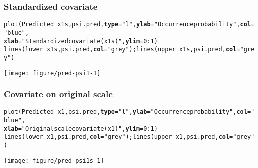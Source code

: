 \documentclass[color=usenames,dvipsnames]{beamer}\usepackage[]{graphicx}\usepackage[]{xcolor}
\makeatletter
\newcommand{\hlnum}[1]{\textcolor[rgb]{0.69,0.494,0}{#1}}%
\newcommand{\hlsng}[1]{\textcolor[rgb]{0.749,0.012,0.012}{#1}}%
\newcommand{\hlopt}[1]{\textcolor[rgb]{0,0,0}{#1}}%
\newcommand{\hldef}[1]{\textcolor[rgb]{0,0,0}{#1}}%
\newcommand{\hlkwc}[1]{\textcolor[rgb]{0,0,0}{\textbf{#1}}}%
\newcommand{\hlkwd}[1]{\textcolor[rgb]{0.004,0.004,0.506}{#1}}%
\newenvironment{kframe}{%
 \def\at@end@of@kframe{}%
 \ifinner\ifhmode%
  \def\at@end@of@kframe{\end{minipage}}%
  \begin{minipage}{\columnwidth}%
 \fi\fi%
 \def\FrameCommand##1{\hskip\@totalleftmargin \hskip-\fboxsep
 \colorbox{shadecolor}{##1}\hskip-\fboxsep
     \hskip-\linewidth \hskip-\@totalleftmargin \hskip\columnwidth}%
 \MakeFramed {\advance\hsize-\width
   \@totalleftmargin\z@ \linewidth\hsize
   \@setminipage}}%
 {\par\unskip\endMakeFramed%
 \at@end@of@kframe}
\newenvironment{knitrout}{}{} %
\makeatother
\begin{document}
\begin{frame}[fragile]
  \frametitle{Standardized covariate}
\begin{knitrout}\tiny
{}\color{fgcolor}\begin{kframe}
\begin{alltt}
\hlkwd{plot}\hldef{(Predicted} \hlopt{~} \hldef{x1s, psi.pred,} \hlkwc{type}\hldef{=}\hlsng{"l"}\hldef{,} \hlkwc{ylab}\hldef{=}\hlsng{"Occurrence probability"}\hldef{,} \hlkwc{col}\hldef{=}\hlsng{"blue"}\hldef{,}
     \hlkwc{xlab}\hldef{=}\hlsng{"Standardized covariate (x1s)"}\hldef{,} \hlkwc{ylim}\hldef{=}\hlnum{0}\hlopt{:}\hlnum{1}\hldef{)}
\hlkwd{lines}\hldef{(lower} \hlopt{~} \hldef{x1s, psi.pred,} \hlkwc{col}\hldef{=}\hlsng{"grey"}\hldef{);} \hlkwd{lines}\hldef{(upper} \hlopt{~} \hldef{x1s, psi.pred,} \hlkwc{col}\hldef{=}\hlsng{"grey"}\hldef{)}
\end{alltt}
\end{kframe}

{\centering \texttt{[image: figure/pred-psi1-1]} 

}


\end{knitrout}
\end{frame}




\begin{frame}[fragile]
  \frametitle{Covariate on original scale}
\begin{knitrout}\tiny
{}\color{fgcolor}\begin{kframe}
\begin{alltt}
\hlkwd{plot}\hldef{(Predicted} \hlopt{~} \hldef{x1, psi.pred,} \hlkwc{type}\hldef{=}\hlsng{"l"}\hldef{,} \hlkwc{ylab}\hldef{=}\hlsng{"Occurrence probability"}\hldef{,} \hlkwc{col}\hldef{=}\hlsng{"blue"}\hldef{,}
     \hlkwc{xlab}\hldef{=}\hlsng{"Original scale covariate (x1)"}\hldef{,} \hlkwc{ylim}\hldef{=}\hlnum{0}\hlopt{:}\hlnum{1}\hldef{)}
\hlkwd{lines}\hldef{(lower} \hlopt{~} \hldef{x1, psi.pred,} \hlkwc{col}\hldef{=}\hlsng{"grey"}\hldef{);} \hlkwd{lines}\hldef{(upper} \hlopt{~} \hldef{x1, psi.pred,} \hlkwc{col}\hldef{=}\hlsng{"grey"}\hldef{)}
\end{alltt}
\end{kframe}

{\centering \texttt{[image: figure/pred-psi1s-1]} 

}


\end{knitrout}
\end{frame}
\end{document}
